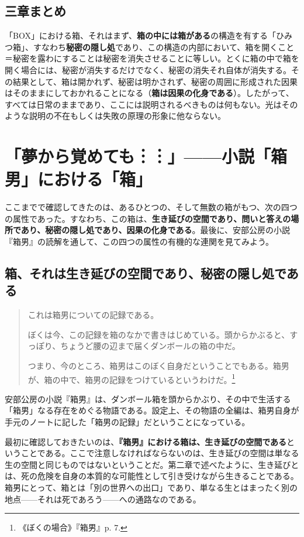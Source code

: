 \documentclass[9pt,b5j,twoside,twocolumn]{utarticle}
\begin{document}
\subsection*{三章まとめ}

「BOX」における箱、それはまず、\textbf{箱の中には箱がある}の構造を有する「ひみつ箱」、すなわち\textbf{秘密の隠し処}であり、この構造の内部において、箱を開くこと＝秘密を露わにすることは秘密を消失させることに等しい。とくに箱の中で箱を開く場合には、秘密が消失するだけでなく、秘密の消失それ自体が消失する。その結果として、箱は開かれず、秘密は明かされず、秘密の周囲に形成された因果はそのままにしておかれることになる（\textbf{箱は因果の化身である}）。したがって、すべては日常のままであり、ここには説明されるべきものは何もない。光はそのような説明の不在もしくは失敗の原理の形象に他ならない。

\section{\tbaselineshift =4.0pt 「夢から覚めても︙︙」------小説「箱男」における「箱」}

ここまでで確認してきたのは、あるひとつの、そして無数の箱がもつ、次の四つの属性であった。すなわち、この箱は、\textbf{生き延びの空間であり、問いと答えの場所であり、秘密の隠し処であり、因果の化身である}。最後に、安部公房の小説『箱男』の読解を通して、この四つの属性の有機的な連関を見てみよう。

\subsection{箱、それは生き延びの空間であり、秘密の隠し処である}

\begin{quotation}
これは箱男についての記録である。

ぼくは今、この記録を箱のなかで書きはじめている。頭からかぶると、すっぽり、ちょうど腰の辺まで届くダンボールの箱の中だ。

つまり、今のところ、箱男はこのぼく自身だということでもある。箱男が、箱の中で、箱男の記録をつけているというわけだ。\footnote{《ぼくの場合》『箱男』p. 7.}
\end{quotation}

安部公房の小説『箱男』は、ダンボール箱を頭からかぶり、その中で生活する「箱男」なる存在をめぐる物語である。設定上、その物語の全編は、箱男自身が手元のノートに記した「箱男の記録」だということになっている。

最初に確認しておきたいのは、\textbf{『箱男』における箱は、生き延びの空間である}ということである。ここで注意しなければならないのは、生き延びの空間は単なる生の空間と同じものではないということだ。第二章で述べたように、生き延びとは、死の危険を自身の本質的な可能性として引き受けながら生きることである。箱男にとって、箱とは「別の世界への出口」であり、単なる生とはまったく別の地点------それは死であろう------への通路なのである。
\end{document}
